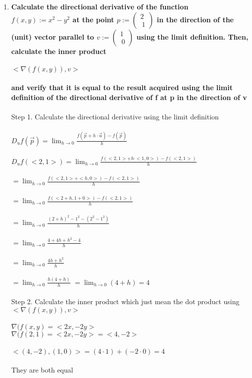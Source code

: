 \documentclass{article}
\begin{document}
\begin{enumerate}[12.]
	\item\textbf{Calculate the directional derivative of the function $f(x, y) := x^2-y^2$ at the point $p := \left(\!\begin{array}{c} 2 \\\ 1 \end{array} \!\right)$ in the direction of the (unit) vector parallel to $v := \left(\!\begin{array}{c} 1 \\\ 0 \end{array} \!\right)$ using the limit definition. Then, calculate the inner product\\
	      \\
	      $<\nabla(f(x,y)),v>$\\\\and verify that it is equal to the result acquired using the limit definition of the directional derivative of f at p in the direction of v}\\
	\\
	Step 1. Calculate the directional derivative using the limit definition\\
	\\
	$D_{u}f(\vec{p})=\lim_{h \to 0} \frac{f(\vec{p}+h\cdot\vec{u})-f(\vec{p})}{h}$\\
	\\
	$D_{u}f(<2,1>)=\lim_{h \to 0} \frac{f(<2,1>+h\cdot<1,0>)-f(<2,1>)}{h}$\\
	\\
	$=\lim_{h \to 0} \frac{f(<2,1>+<h,0>)-f(<2,1>)}{h}$\\
	\\
	$=\lim_{h \to 0} \frac{f(<2+h,1+0>)-f(<2,1>)}{h}$\\
	\\
	$=\lim_{h \to 0} \frac{(2+h)^{2}-1^{2}-(2^{2}-1^{2})}{h}$\\
	\\
	$=\lim_{h \to 0} \frac{4+4h+h^{2}-4}{h}$\\
	\\
	$=\lim_{h \to 0} \frac{4h+h^{2}}{h}$\\
	\\
	$=\lim_{h \to 0} \frac{h(4+h)}{h}$
	$=\lim_{h \to 0} (4+h)=4$
	\\
	\\
	Step 2. Calculate the inner product which just mean the dot product using $<\nabla(f(x,y)),v>$
	\\
	\\
	$\nabla(f(x,y)=<2x,-2y>$\\
	$\nabla(f(2,1)=<2x,-2y>=<4,-2>$\\
	\\
	$<(4,-2),(1,0)>=(4\cdot1)+(-2\cdot0)=4$
	\\
	\\
	They are both equal 
\end{enumerate}
\end{document}
